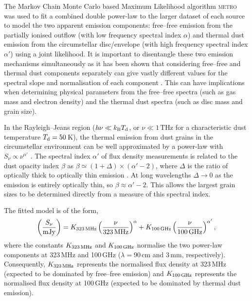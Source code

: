 \documentclass[9pt]{extarticle}   	%
\begin{document}
The Markov Chain Monte Carlo based Maximum Likelihood algorithm \textsc{metro} \citep{hob04} was used to fit a combined double power-law to the larger dataset of each source to model the two apparent emission components: free--free emission from the partially ionised outflow (with low frequency spectral index $\alpha$) and thermal dust emission from the circumstellar disc/envelope (with high frequency spectral index $\alpha'$) using a joint likelihood. It is important to disentangle these two emission mechanisms simultaneously as it has been shown that considering free--free and thermal dust components separately can give vastly different values for the spectral slope and normalisation of each component \citep[e.g.][]{2012MNRAS.420.3334S}. This can have implications when determining physical parameters from the free--free spectra (such as gas mass and electron density) and the thermal dust spectra (such as disc mass and grain size).

In the Rayleigh--Jeans region ($h\nu \ll k_{\rm B}T_{\rm d}$, or $\nu\ll1$\,THz for a characteristic dust temperature $T_{\rm d}=50$\,K), the thermal emission from dust grains in the circumstellar environment can be well approximated by a power-law with $S_\nu \propto \nu^{\alpha'}$ \citep[e.g.][]{2013MNRAS.435.1139S}. The spectral index $\alpha'$ of flux density measurements is related to the dust opacity index $\beta$ as $\beta \simeq (1+\Delta)\times(\alpha'-2)$, where $\Delta$ is the ratio of optically thick to optically thin emission \citep{1990AJ.....99..924B}. At long wavelengths $\Delta \rightarrow 0$ as the emission is entirely optically thin, so $\beta\approx\alpha'-2$. This allows the largest grain sizes to be determined directly from a measure of this spectral index. 

The fitted model is of the form,
\begin{equation}
\left( \frac{S_\nu}{\rm mJy} \right) = K_{323\,\rm{MHz}} \left( \frac{\nu}{\rm 323\,MHz} \right)^\alpha + K_{100\,\rm{GHz}} \left( \frac{\nu}{\rm 100\,GHz} \right)^{\alpha'},
\end{equation}
where the constants $K_{323\,\rm{MHz}}$ and $K_{100\,\rm{GHz}}$ normalise the two power-law components at 323\,MHz and 100\,GHz ($\lambda=90$\,cm and 3\,mm, respectively). Consequently, $K_{323\,\rm{MHz}}$ represents the normalised flux density at 323\,MHz (expected to be dominated by free--free emission) and $K_{100\,\rm{GHz}}$ represents the normalised flux density at 100\,GHz (expected to be dominated by thermal dust emission).  
\end{document}
